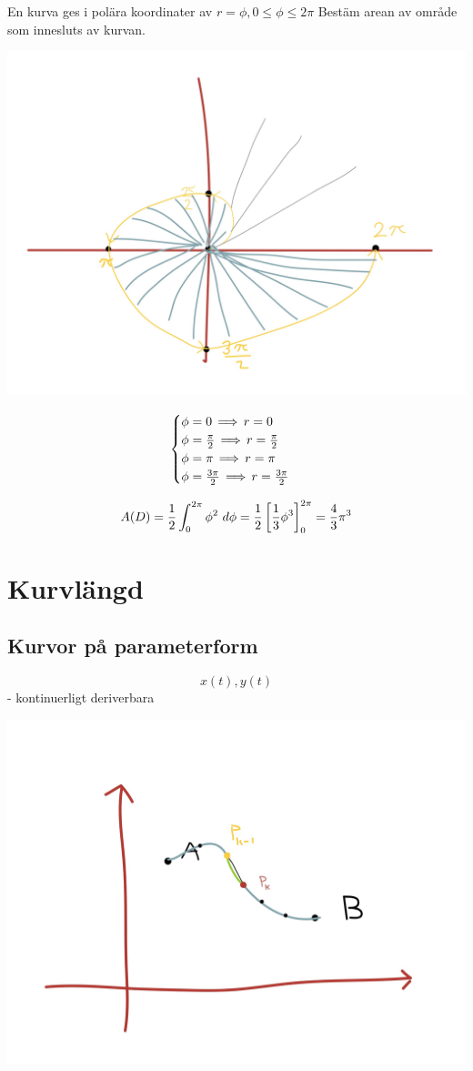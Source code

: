 \documentclass{article}
\begin{document}
En kurva ges i polära koordinater av $r=\phi, 0\le\phi\le 2\pi$
Bestäm arean av område som innesluts av kurvan.

\includegraphics[scale=0.15]{img/img9.jpg}

$$
\begin{cases}
  \phi = 0\operatorname{\implies} r = 0\\
  \phi = \frac{\pi}{2} \operatorname{\implies} r=\frac{\pi}{2}\\
  \phi = \pi\operatorname{\implies} r=\pi\\
  \phi = \frac{3\pi}{2}\operatorname{\implies} r=\frac{3\pi}{2}\\
\end{cases}
$$

$$ A(D) = \f 12 \int^{2\pi}_0{\phi^2\ d\phi} = \f 12\bra{\f 13 \phi^3}_{0}^{2\pi} = \f 43 \pi^3$$

\section{Kurvlängd}
\subsection{Kurvor på parameterform}

$$ x(t), y(t) $$ - kontinuerligt deriverbara

\includegraphics[scale=0.15]{img/img10.jpg}
\end{document}
